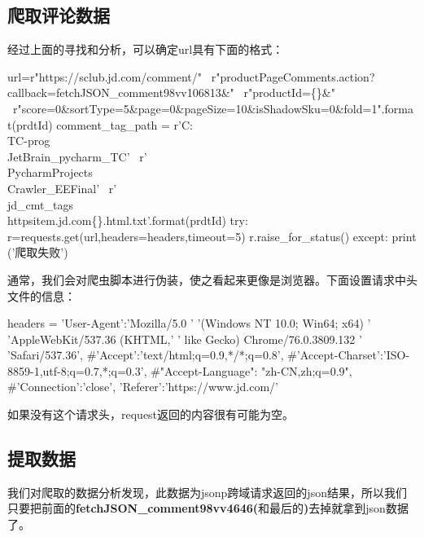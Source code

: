 \subsection{爬取评论数据}
经过上面的寻找和分析，可以确定url具有下面的格式：
\begin{python}
url=r"https://sclub.jd.com/comment/" \
    r"productPageComments.action?callback=fetchJSON_comment98vv106813\&" \
    r"productId=\{\}\&" \
    r"score=0\&sortType=5\&page=0\&pageSize=10\&isShadowSku=0\&fold=1".format(prdtId)
comment_tag_path = r'C:\\TC-prog\\JetBrain\_pycharm\_TC' \
                   r'\\PycharmProjects\\Crawler\_EEFinal' \
                   r'\\jd\_cmt\_tags\\httpsitem.jd.com\{\}.html.txt'.format(prdtId)
try:
    r=requests.get(url,headers=headers,timeout=5)
    r.raise_for_status()
except:
    print ('爬取失败')
\end{python}
通常，我们会对爬虫脚本进行伪装，使之看起来更像是浏览器。下面设置请求中头文件的信息：
\begin{python}
headers = {'User-Agent':'Mozilla/5.0 '
                        '(Windows NT 10.0; Win64; x64) '
                        'AppleWebKit/537.36 (KHTML,'
                        ' like Gecko) Chrome/76.0.3809.132 '
                        'Safari/537.36',
#'Accept':'text/html;q=0.9,*/*;q=0.8',
#'Accept-Charset':'ISO-8859-1,utf-8;q=0.7,*;q=0.3',
#"Accept-Language": "zh-CN,zh;q=0.9",
#'Connection':'close',
'Referer':'https://www.jd.com/'
}
\end{python}
如果没有这个请求头，request返回的内容很有可能为空。

\subsection{提取数据}
我们对爬取的数据分析发现，此数据为jsonp跨域请求返回的json结果，所以我们只要把前面的\textbf{fetchJSON_comment98vv4646(}和最后的\textbf{)}去掉就拿到json数据了。


